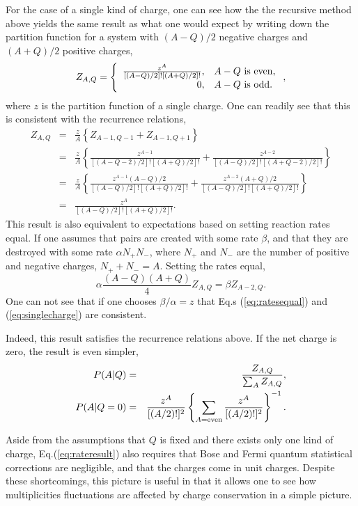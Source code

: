 \documentclass[aps,prc,nofootinbib,showpacs,superscriptaddress,groupedaddress]{revtex4-1}
\begin{document}
For the case of a single kind of charge, one can see how the the recursive method above yields the same result as what one would expect by writing down the partition function for a system with $(A-Q)/2$ negative charges and $(A+Q)/2$ positive charges,
\begin{eqnarray}
\label{eq:singlecharge}
Z_{A,Q}=\left\{\begin{array}{rl}
\frac{z^A}{[(A-Q)/2]![(A+Q)/2]!},&A-Q~{\rm is~even},\\
0,&A-Q~{\rm is~odd}.\end{array}\right. ,
\end{eqnarray}
where $z$ is the partition function of a single charge. One can readily see that this is consistent with the recurrence relations,
\begin{eqnarray}
Z_{A,Q}&=&\frac{z}{A}\left\{Z_{A-1,Q-1}+Z_{A-1,Q+1}\right\}\\
\nonumber
&=&\frac{z}{A}\left\{\frac{z^{A-1}}{[(A-Q-2)/2]![(A+Q)/2]!}+\frac{z^{A-2}}{[(A-Q)/2]![(A+Q-2)/2]!}\right\}\\
\nonumber
&=&\frac{z}{A}\left\{\frac{z^{A-1}(A-Q)/2}{[(A-Q)/2]![(A+Q)/2]!}+\frac{z^{A-2}(A+Q)/2}{[(A-Q)/2]![(A+Q)/2]!}\right\}\\
&=&\frac{z^A}{[(A-Q)/2]![(A+Q)/2]!}.
\end{eqnarray}
This result is also equivalent to expectations based on setting reaction rates equal. If one assumes that pairs are created with some rate $\beta$, and that they are destroyed with some rate $\alpha N_+N_-$, where $N_+$ and $N_-$ are the number of positive and negative charges, $N_++N_-=A$. Setting the rates equal,
\begin{equation}\label{eq:ratesequal}
\alpha \frac{(A-Q)(A+Q)}{4}Z_{A,Q}=\beta Z_{A-2,Q}.
\end{equation}
One can not see that if one chooses $\beta/\alpha=z$ that Eq.s (\ref{eq:ratesequal}) and (\ref{eq:singlecharge}) are consistent.



Indeed, this result satisfies the recurrence relations above. If the net charge is zero, the result is even simpler,
\begin{eqnarray}
\label{eq:PAgivenQcanonical}
P(A|Q)&=&\frac{Z_{A,Q}}{\sum_A Z_{A,Q}},\\
\nonumber
P(A|Q=0)&=& \frac{z^A}{[(A/2)!]^2}\left\{\sum_{A={\rm even}} \frac{z^A}{[(A/2)!]^2}\right\}^{-1}.
\end{eqnarray}

Aside from the assumptions that $Q$ is fixed and there exists only one kind of charge, Eq.(\ref{eq:rateresult}) also requires that Bose and Fermi quantum statistical corrections are negligible, and that the charges come in unit charges. Despite these shortcomings, this picture is useful in that it allows one to see how multiplicities fluctuations are affected by charge conservation in a simple picture. 
\end{document}
